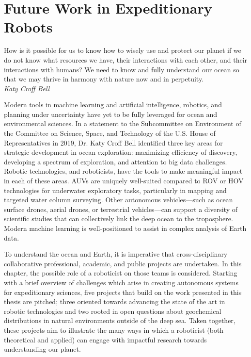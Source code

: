 \chapter{Future Work in Expeditionary Robots}
\label{chap:future}

\begin{center}
    \begin{minipage}{0.7\textwidth}
      \begin{small}
        How is it possible for us to know how to wisely use and protect our planet if we do not know
        what resources we have, their interactions with each other, and their interactions with humans? We need to know and fully understand our ocean so that we may thrive in harmony with nature now and in perpetuity.\\ \emph{Katy Croff Bell}
      \end{small}
    \end{minipage}
    \vspace{0.5cm}
\end{center}



Modern tools in machine learning and artificial intelligence, robotics, and planning under uncertainty have yet to be fully leveraged for ocean and environmental sciences.
In a statement to the Subcommittee on Environment of the Committee on Science, Space, and Technology of the U.S. House of Representatives in 2019\autocite{bell2019envisioning}, Dr. Katy Croff Bell identified three key areas for strategic development in ocean exploration: maximizing efficiency of discovery, developing a spectrum of exploration, and attention to big data challenges.
Robotic technologies, and roboticists, have the tools to make meaningful impact in each of these areas.
AUVs are uniquely well-suited compared to ROV or HOV technologies for underwater exploratory tasks, particularly in mapping and targeted water column surveying.
Other autonomous vehicles---such as ocean surface drones, aerial drones, or terrestrial vehicles---can support a diversity of scientific studies that can collectively link the deep ocean to the troposphere.
Modern machine learning is well-positioned to assist in complex analysis of Earth data.

To understand the ocean and Earth, it is imperative that cross-disciplinary collaborative professional, academic, and public projects are undertaken. In this chapter, the possible role of a roboticist on those teams is considered. Starting with a brief overview of challenges which arise in creating autonomous systems for expeditionary sciences, five projects that build on the work presented in this thesis are pitched; three oriented towards advancing the state of the art in robotic technologies and two rooted in open questions about geochemical distributions in natural environments outside of the deep sea. Taken together, these projects aim to illustrate the many ways in which a roboticist (both theoretical and applied) can engage with impactful research towards understanding our planet.

